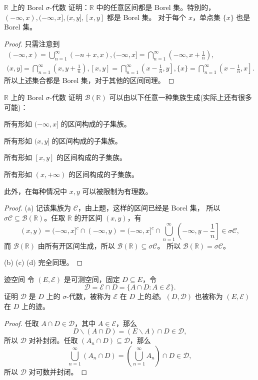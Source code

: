 \documentclass[fontset=none]{Notes}
\begin{document}
\begin{exercise}{$\mathbb{R}$ 上的 Borel $\sigma$-代数}{}
  证明：$\mathbb{R}$ 中的任意区间都是 Borel 集。特别的，$(-\infty,x),(-\infty,x],(x,y],[x,y]$ 都是 Borel 集。
  对于每个 $x$，单点集 $\{x\}$ 也是 Borel 集。 
\end{exercise}
\begin{proof}
  只需注意到
  \begin{gather*}
    (-\infty,x)=\bigcup_{n=1}^\infty \left(-n+x,x\right), 
    (-\infty, x]=\bigcap_{n=1}^\infty \left(-\infty,x+\frac{1}{n}\right),\\
    (x,y]=\bigcap_{n=1}^\infty \left(x,y+\frac{1}{n}\right),
    [x,y]=\bigcap_{n=1}^\infty\left(x-\frac{1}{n},y\right],
    \{x\}=\bigcap_{n=1}^\infty\left(x-\frac{1}{n},x\right].
  \end{gather*}
  所以上述集合都是 Borel 集，对于其他的区间同理。
\end{proof}

\begin{exercise}{$\mathbb{R}$ 上的 Borel $\sigma$-代数}{}
  证明 $\mathcal{B}(\mathbb{R})$ 可以由以下任意一种集族生成(实际上还有很多可能)：
  \begin{alphenum}[nosep]
    \item 所有形如 $(-\infty, x]$ 的区间构成的子集族。
    \item 所有形如 $(x,y]$ 的区间构成的子集族。
    \item 所有形如 $[x,y]$ 的区间构成的子集族。
    \item 所有形如 $(x,+\infty)$ 的区间构成的子集族。
  \end{alphenum}
  此外，在每种情况中 $x,y$ 可以被限制为有理数。
\end{exercise}
\begin{proof}
  (a) 记该集族为 $\mathcal{C}$，由上题，这样的区间已经是 Borel 集，
  所以 $\sigma\mathcal{C}\subseteq \mathcal{B}(\mathbb{R})$。任取 $\mathbb{R}$
  的开区间 $(x,y)$，有
  \[
    (x,y)=(-\infty,x]^c\cap (-\infty, y)=
    (-\infty,x]^c\cap\bigcup_{n=1}^\infty \left(-\infty,y-\frac{1}{n}\right]\in\sigma \mathcal{C},
  \]
  而 $\mathcal{B}(\mathbb{R})$ 由所有开区间生成，所以 $\mathcal{B}(\mathbb{R})\subseteq \sigma \mathcal{C}$。
  所以 $\mathcal{B}(\mathbb{R})=\sigma \mathcal{C}$。

  (b) (c) (d) 完全同理。
\end{proof}

\begin{exercise}{迹空间}{}
  令 $(E,\mathcal{E})$ 是可测空间，固定 $D\subseteq E$，令
  \[
    \mathcal{D}=\mathcal{E}\cap D=\{A\cap D:A\in \mathcal{E}\}.  
  \]
  证明 $\mathcal{D}$ 是 $D$ 上的 $\sigma$-代数，被称为 $\mathcal{E}$
  在 $D$ 上的\emph{迹}。$(D,\mathcal{D})$ 也被称为 $(E,\mathcal{E})$
  在 $D$ 上的迹。
\end{exercise}
\begin{proof}
  任取 $A\cap D\in \mathcal{D}$，其中 $A\in \mathcal{E}$，那么
  \[
    D \smallsetminus (A\cap D)= (E \smallsetminus A)\cap D\in \mathcal{D},
  \]
  所以 $\mathcal{D}$ 对补封闭。任取 $(A_n\cap D)\subseteq \mathcal{D}$，那么
  \[
    \bigcup_{n=1}^\infty  (A_n\cap D)=\left(\bigcup_{n=1}^\infty A_n\right)\cap D\in \mathcal{D},
  \]
  所以 $\mathcal{D}$ 对可数并封闭。
\end{proof}
\end{document}
